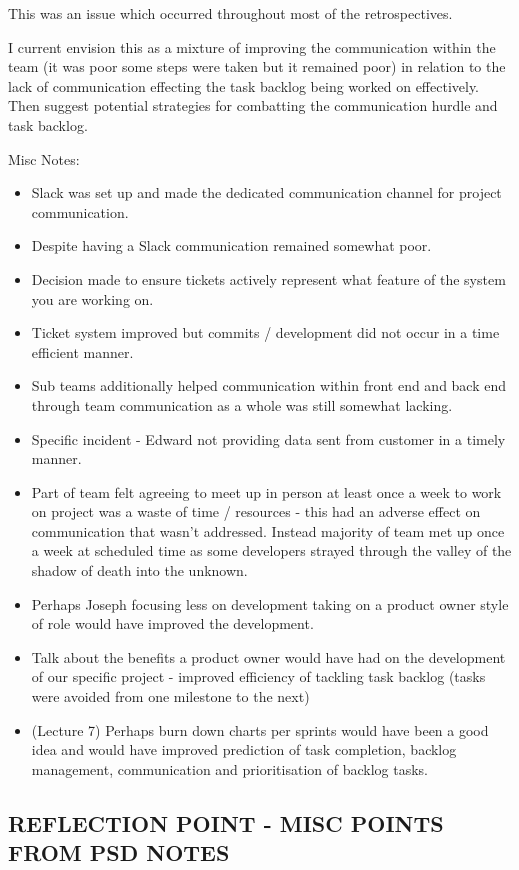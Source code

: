 \documentclass{l3proj}
\begin{document}
This was an issue which occurred throughout most of the retrospectives.

I current envision this as a mixture of improving the communication within the team (it was poor some steps were taken but it remained poor) in relation to the lack of communication effecting the task backlog being worked on effectively. Then suggest potential strategies for combatting the communication hurdle and task backlog.

Misc Notes:
\begin{itemize}
\item Slack was set up and made the dedicated communication channel for project communication.
\item Despite having a Slack communication remained somewhat poor.
\item Decision made to ensure tickets actively represent what feature of the system you are working on.
\item Ticket system improved but commits / development did not occur in a time efficient manner.
\item Sub teams additionally helped communication within front end and back end through team communication as a whole was still somewhat lacking.
\item Specific incident - Edward not providing data sent from customer in a timely manner.
\item Part of team felt agreeing to meet up in person at least once a week to work on project was a waste of time / resources - this had an adverse effect on communication that wasn’t addressed. Instead majority of team met up once a week at scheduled time as some developers strayed through the valley of the shadow of death into the unknown.
\item Perhaps Joseph focusing less on development taking on a product owner style of role would have improved the development.
\item Talk about the benefits a product owner would have had on the development of our specific project - improved efficiency of tackling task backlog (tasks were avoided from one milestone to the next)
\item (Lecture 7) Perhaps burn down charts per sprints would have been a good idea and would have improved prediction of task completion, backlog management, communication and prioritisation of backlog tasks.
\end{itemize}


\subsection{REFLECTION POINT - MISC POINTS FROM PSD NOTES}
\label{sec:miscpsd}
\end{document}
